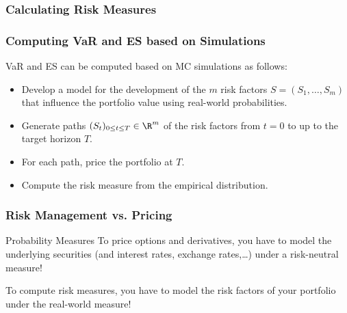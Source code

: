 \subsubsection{Calculating Risk Measures}

\begin{frame}[fragile]
\frametitle{Computing VaR and ES based on Simulations}
VaR and ES can be computed based on MC simulations as follows:
\begin{itemize}
  \item Develop a model for the development of the $m$ risk factors
  $S=(S_1,\ldots,S_m)$ that influence the portfolio value using real-world
  probabilities.
  \item Generate paths $(S_t)_{0\leq t\leq T}\in \R^m$ of the risk factors
  from $t=0$ to up to the target horizon $T$.
  \item For each path, price the portfolio at $T$.
  \item Compute the risk measure from the empirical distribution.
\end{itemize}
\end{frame}

\begin{frame}[fragile]
\frametitle{Risk Management vs. Pricing}
\begin{block}{Probability Measures}
To price options and derivatives, you have to model the underlying securities
(and interest rates, exchange rates,\ldots) under a risk-neutral measure!

To compute risk measures, you have to model the risk factors of your portfolio
under the real-world measure!
\end{block}
\end{frame}







